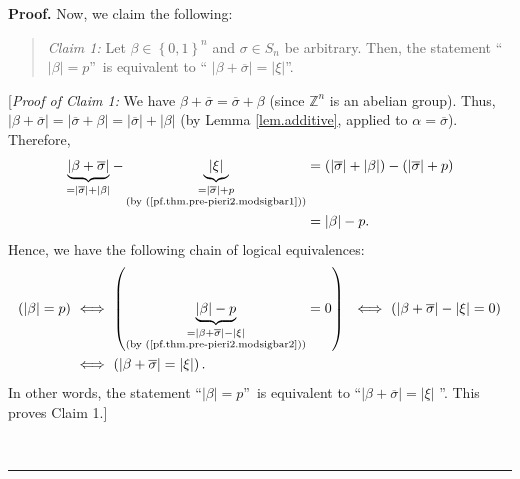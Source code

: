 \documentclass
[numbers=enddot,12pt,final,onecolumn,notitlepage,english]{scrartcl}%
\theoremstyle{definition}
\newenvironment{statement}{\begin{quote}}{\end{quote}}
\newenvironment{proof}[1][Proof]{\noindent\textbf{#1.} }{\ \rule{0.5em}{0.5em}}
\newenvironment{verlong}{}{}
\begin{document}
\begin{verlong}
\begin{proof}
Now, we claim the following:

\begin{statement}
\textit{Claim 1:} Let $\beta\in\left\{  0,1\right\}  ^{n}$ and $\sigma\in
S_{n}$ be arbitrary. Then, the statement \textquotedblleft$\left\vert
\beta\right\vert =p$\textquotedblright\ is equivalent to \textquotedblleft%
$\left\vert \beta+\overline{\sigma}\right\vert =\left\vert \xi\right\vert
$\textquotedblright.
\end{statement}

[\textit{Proof of Claim 1:} We have $\beta+\overline{\sigma}=\overline{\sigma
}+\beta$ (since $\mathbb{Z}^{n}$ is an abelian group). Thus, $\left\vert
\beta+\overline{\sigma}\right\vert =\left\vert \overline{\sigma}%
+\beta\right\vert =\left\vert \overline{\sigma}\right\vert +\left\vert
\beta\right\vert $ (by Lemma \ref{lem.additive}, applied to $\alpha
=\overline{\sigma}$). Therefore,%
\begin{align}
\underbrace{\left\vert \beta+\overline{\sigma}\right\vert }_{=\left\vert
\overline{\sigma}\right\vert +\left\vert \beta\right\vert }%
-\underbrace{\left\vert \xi\right\vert }_{\substack{=\left\vert \overline
{\sigma}\right\vert +p\\\text{(by (\ref{pf.thm.pre-pieri2.modsigbar1}))}}}  &
=\left(  \left\vert \overline{\sigma}\right\vert +\left\vert \beta\right\vert
\right)  -\left(  \left\vert \overline{\sigma}\right\vert +p\right)
\nonumber\\
&  =\left\vert \beta\right\vert -p. \label{pf.thm.pre-pieri2.modsigbar2}%
\end{align}
Hence, we have the following chain of logical equivalences:%
\begin{align*}
\left(  \left\vert \beta\right\vert =p\right)  \  &  \Longleftrightarrow
\ \left(  \underbrace{\left\vert \beta\right\vert -p}_{\substack{=\left\vert
\beta+\overline{\sigma}\right\vert -\left\vert \xi\right\vert \\\text{(by
(\ref{pf.thm.pre-pieri2.modsigbar2}))}}}=0\right)  \ \ \Longleftrightarrow
\ \left(  \left\vert \beta+\overline{\sigma}\right\vert -\left\vert
\xi\right\vert =0\right) \\
&  \Longleftrightarrow\ \left(  \left\vert \beta+\overline{\sigma}\right\vert
=\left\vert \xi\right\vert \right)  .
\end{align*}
In other words, the statement \textquotedblleft$\left\vert \beta\right\vert
=p$\textquotedblright\ is equivalent to \textquotedblleft$\left\vert
\beta+\overline{\sigma}\right\vert =\left\vert \xi\right\vert $%
\textquotedblright. This proves Claim 1.] \medskip


\end{proof}
\end{verlong}
\end{document}
